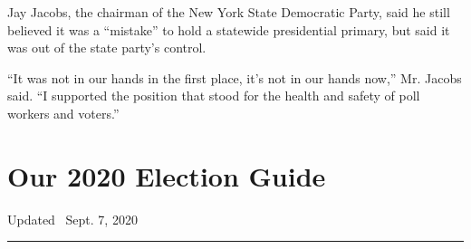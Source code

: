 Jay Jacobs, the chairman of the New York State Democratic Party, said he
still believed it was a ``mistake'' to hold a statewide presidential
primary, but said it was out of the state party's control.

``It was not in our hands in the first place, it's not in our hands
now,'' Mr. Jacobs said. ``I supported the position that stood for the
health and safety of poll workers and voters.''

\hypertarget{our-2020-election-guide}{%
\section{Our 2020 Election Guide}\label{our-2020-election-guide}}

Updated ~Sept. 7, 2020

\begin{center}\rule{0.5\linewidth}{\linethickness}\end{center}


